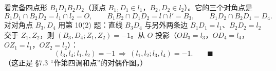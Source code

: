\zheng 看完备四点形 $B_1D_1B_2D_2$（顶点 $B_1,D_1\in l_1$，$B_2,D_2\in l_2$）。它的三个对角点是
\[
B_1D_1\cap B_2D_2=l_1\cap l_2=O,\qquad B_1B_2\cap D_1D_2=l\cap l'=B_3,\qquad B_1D_2\cap B_2D_1=D_4 .
\]
对对角点 $B_3,D_4$ 用第 10(2) 题：直线 $B_3D_4$ 与另外两条边 $B_1D_1=l_1$、$B_2D_2=l_2$ 交于 $Z_1,Z_2$，则 $(B_3,D_4;Z_1,Z_2)=-1$。从 $O$ 投影（$OB_3=l_3$，$OD_4=l_4$，$OZ_1=l_1$，$OZ_2=l_2$）：
\[
(l_3,l_4;l_1,l_2)=-1\ \Rightarrow\ (l_1,l_2;l_3,l_4)=-1 .\qquad\blacksquare
\]
（这正是 \S7.3 “作第四调和点”的对偶作图。）
